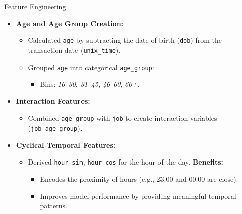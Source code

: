 \documentclass{beamer}
\begin{document}
\begin{frame}{Feature Engineering}
    \begin{itemize}
        \item \textbf{Age and Age Group Creation:}
        \begin{itemize}
            \item Calculated \texttt{age} by subtracting the date of birth (\texttt{dob}) from the transaction date (\texttt{unix\_time}).
            \item Grouped \texttt{age} into categorical \texttt{age\_group}:
            \begin{itemize}
                \item Bins: \textit{16–30}, \textit{31–45}, \textit{46–60}, \textit{60+}.
            \end{itemize}
        \end{itemize}
        \item \textbf{Interaction Features:}
        \begin{itemize}
            \item Combined \texttt{age\_group} with \texttt{job} to create interaction variables (\texttt{job\_age\_group}).
        \end{itemize}
        \item \textbf{Cyclical Temporal Features:}
        \begin{itemize}
            \item Derived \texttt{hour\_sin}, \texttt{hour\_cos} for the hour of the day.
            \textbf{Benefits:}
            \begin{itemize}
                \item Encodes the proximity of hours (e.g., 23:00 and 00:00 are close).
                \item Improves model performance by providing meaningful temporal patterns.
            \end{itemize}
        \end{itemize}
    \end{itemize}
\end{frame}
\end{document}
